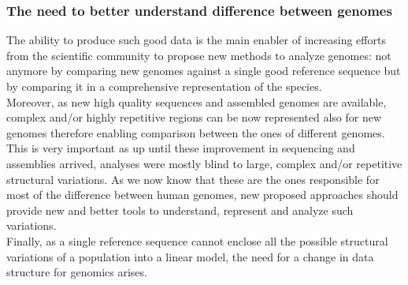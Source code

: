 \subsubsection{The need to better understand difference between genomes}
The ability to produce such good data is the main enabler of increasing efforts from the scientific community to propose new methods to analyze genomes: not anymore by comparing new genomes against a single good reference sequence but by comparing it in a comprehensive representation of the species. \\
Moreover, as new high quality sequences and assembled genomes are available, complex and/or highly repetitive regions can be now represented also for new genomes therefore enabling comparison between the ones of different genomes. This is very important as up until these improvement in sequencing and assemblies arrived, analyses were mostly blind to large, complex and/or repetitive structural variations. As we now know that these are the ones responsible for most of the difference between human genomes, new proposed approaches should provide new and better tools to understand, represent and analyze such variations.\\
Finally, as a single reference sequence cannot enclose all the possible structural variations of a population into a linear model, the need for a change in data structure for genomics arises.


